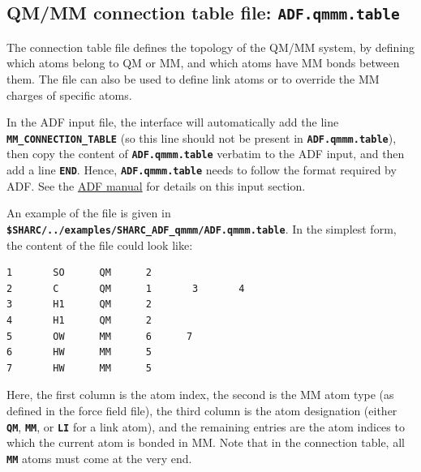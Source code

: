 \documentclass[a4paper,10pt,DIV=15,openany]{scrbook}
\newcommand{\link}[2]{\href{#1}{#2}}
\newcommand{\ttt}[1]{\textbf{\texttt{#1}}}
\newenvironment{example}{
  \setlength{\OuterFrameSep}{3pt}
  \vspace{0mm}
  \definecolor{shadecolor}{HTML}{E4F4FF}
  \begin{shaded}
}{
  \end{shaded}
}
\begin{document}
\subsection{QM/MM connection table file: \ttt{ADF.qmmm.table}}

The connection table file defines the topology of the QM/MM system, by defining which atoms belong to QM or MM, and which atoms have MM bonds between them.
The file can also be used to define link atoms or to override the MM charges of specific atoms.

In the ADF input file, the interface will automatically add the line \ttt{MM\_CONNECTION\_TABLE} (so this line should not be present in \ttt{ADF.qmmm.table}), then copy the content of \ttt{ADF.qmmm.table} verbatim to the ADF input, and then add a line \ttt{END}.
Hence, \ttt{ADF.qmmm.table} needs to follow the format required by ADF.
See the \link{https://www.scm.com/doc/QMMM/ADF_QMMM/QMMM_keyblock_options.html}{ADF manual} for details on this input section.

An example of the file is given in \ttt{\$SHARC/../examples/SHARC\_ADF\_qmmm/ADF.qmmm.table}.
In the simplest form, the content of the file could look like:
\begin{example}
  \begin{verbatim}
1       SO      QM      2
2       C       QM      1       3       4
3       H1      QM      2
4       H1      QM      2
5       OW      MM      6      7
6       HW      MM      5
7       HW      MM      5
\end{verbatim}
\end{example}
Here, the first column is the atom index, the second is the MM atom type (as defined in the force field file), the third column is the atom designation (either \ttt{QM}, \ttt{MM}, or \ttt{LI} for a link atom), and the remaining entries are the atom indices to which the current atom is bonded in MM.
Note that in the connection table, all \ttt{MM} atoms must come at the very end.
\end{document}
